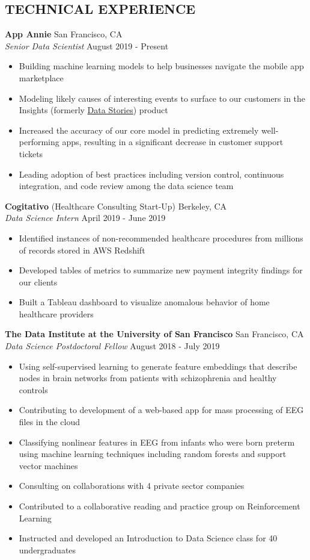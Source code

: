 \documentclass[line,margin,10pt]{res}
\begin{document}
\begin{resume}
\section{TECHNICAL EXPERIENCE}

\textbf{App Annie} \hfill San Francisco, CA \\
{\sl Senior Data Scientist} \hfill August 2019 - Present
\begin{itemize} \itemsep -2pt
\item Building machine learning models to help businesses navigate the mobile app marketplace
\item Modeling likely causes of interesting events to surface to our customers in the Insights (formerly \href{https://www.appannie.com/en/insights/product-announcements/data-stories-labs/}{Data Stories}) product
\item Increased the accuracy of our core model in predicting extremely well-performing apps, resulting in a significant decrease in customer support tickets
\item Leading adoption of best practices including version control, continuous integration, and code review among the data science team
\end{itemize}

\textbf{Cogitativo} (Healthcare Consulting Start-Up) \hfill Berkeley, CA \\
{\sl Data Science Intern} \hfill April 2019 - June 2019
\begin{itemize} \itemsep -2pt
\item Identified instances of non-recommended healthcare procedures from millions of records stored in AWS Redshift
\item Developed tables of metrics to summarize new payment integrity findings for our clients
\item Built a Tableau dashboard to visualize anomalous behavior of home healthcare providers
\end{itemize}

\textbf{The Data Institute at the University of San Francisco} \hfill San Francisco, CA \\
{\sl Data Science Postdoctoral Fellow} \hfill August 2018 - July 2019
\begin{itemize} \itemsep -2pt
\item Using self-supervised learning to generate feature embeddings that describe nodes in brain networks from patients with schizophrenia and healthy controls
\item Contributing to development of a web-based app for mass processing of EEG files in the cloud
\item Classifying nonlinear features in EEG from infants who were born preterm using machine learning techniques including random forests and support vector machines
\item Consulting on collaborations with 4 private sector companies
\item Contributed to a collaborative reading and practice group on Reinforcement Learning
\item Instructed and developed an Introduction to Data Science class for 40 undergraduates
\end{itemize}



\end{resume}
\end{document}

